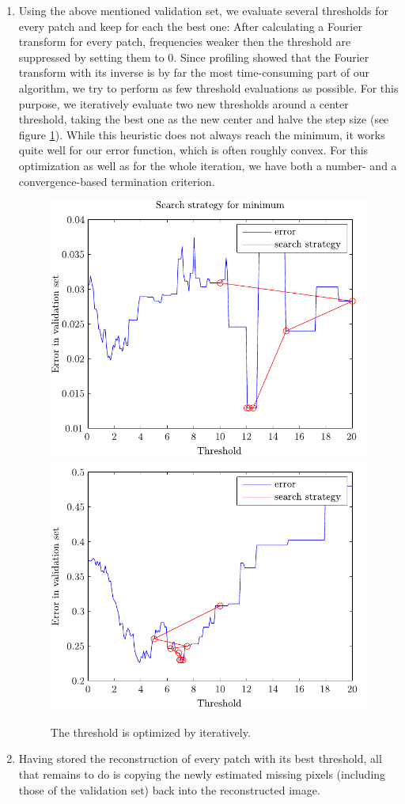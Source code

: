 \documentclass[10pt,conference,compsocconf]{IEEEtran}
\begin{document}
\begin{enumerate}
\item Using the above mentioned validation set, we evaluate several thresholds for every patch and keep for each the best one: After calculating a Fourier transform for every patch, frequencies weaker then the threshold are suppressed by setting them to 0. Since profiling showed that the Fourier transform with its inverse is by far the most time-consuming part of our algorithm, we try to perform as few threshold evaluations as possible. For this purpose, we iteratively evaluate two new thresholds around a center threshold, taking the best one as the new center and halve the step size (see figure \ref{threshold_optimization}). While this heuristic does not always reach the minimum, it works quite well for our error function, which is often roughly convex. For this optimization as well as for the whole iteration, we have both a number- and a convergence-based termination criterion.

\begin{figure}
\centering
\includegraphics[width=0.8\columnwidth]{../plots/search_strategy_6.pdf}
\includegraphics[width=0.8\columnwidth]{../plots/search_strategy_2.pdf}
\caption{The threshold is optimized by iteratively.}
\label{threshold_optimization}
\end{figure}

\item Having stored the reconstruction of every patch with its best threshold, all that remains to do is copying the newly estimated missing pixels (including those of the validation set) back into the reconstructed image.
\end{enumerate}
\end{document}
